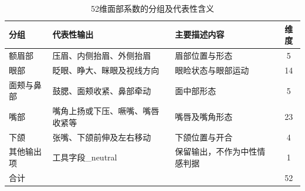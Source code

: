 \begin{table}[H]
    \centering\small
    \caption{52维面部系数的分组及代表性含义}
    \label{tab:p1_visual_groups}
    \setlength{\tabcolsep}{6pt}
    \renewcommand{\arraystretch}{1.12}
    \ifdefined\pOneCompactTableBox\else\newsavebox{\pOneCompactTableBox}\fi
    \begin{lrbox}{\pOneCompactTableBox}
    \begin{tabular}{l>{\raggedright\arraybackslash}p{16em}>{\raggedright\arraybackslash}p{11em}c}
        \toprule
        分组 & 代表性输出 & 主要描述内容 & 维度\\
        \midrule
        额眉部 & 压眉、内侧抬眉、外侧抬眉 & 眉部位置与形态 & 5\\
        眼部 & 眨眼、睁大、眯眼及视线方向 & 眼睑状态与眼部运动 & 14\\
        面颊与鼻部 & 鼓腮、面颊收紧、鼻部牵动 & 面中部形态 & 5\\
        嘴部 & 嘴角上扬或下压、噘嘴、嘴唇收紧等 & 嘴唇及嘴角形态 & 23\\
        下颌 & 张嘴、下颌前伸及左右移动 & 下颌位置与开合 & 4\\
        其他输出项 & 工具字段\_neutral & 保留输出，不作为中性情感判据 & 1\\
        \midrule
        合计 & & & 52\\
        \bottomrule
    \end{tabular}
    \end{lrbox}
    \usebox{\pOneCompactTableBox}
\end{table}
